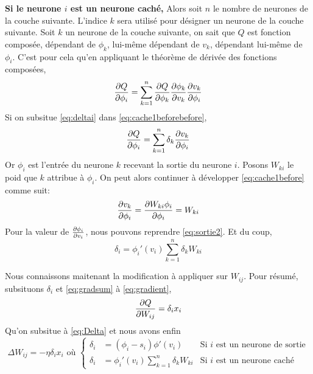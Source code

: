 \textbf{Si le neurone $i$ est un neurone caché,}
Alors soit $n$ le nombre de neurones de la couche suivante.
L'indice $k$ sera utilisé pour désigner un neurone de la couche suivante.
Soit $k$ un neurone de la couche suivante, on sait que $Q$ est fonction composée,
dépendant de $\phi_k$, lui-même dépendant de $v_k$, dépendant lui-même de $\phi_i$.
C'est pour cela qu'en appliquant le théorème de dérivée des fonctions composées,
\begin{equation}\label{eq:cache1beforebefore}
 \frac{\partial Q}{\partial \phi_i} = \sum_{k=1}^{n} \frac{\partial Q}{\partial \phi_k} \frac{\partial \phi_k}{\partial v_k} \frac{\partial v_k}{\partial \phi_i}
\end{equation}
Si on subsitue \eqref{eq:deltai} dans \eqref{eq:cache1beforebefore},
\begin{equation}\label{eq:cache1before}
 \frac{\partial Q}{\partial \phi_i} = \sum_{k=1}^{n} \delta_k \frac{\partial v_k}{\partial \phi_i}
\end{equation}
Or $\phi_i$ est l'entrée du neurone $k$ recevant la sortie du neurone $i$. Posons $W_{ki}$ le poid que $k$ attribue à $\phi_i$.
On peut alors continuer à développer \eqref{eq:cache1before} comme suit:
\begin{equation}\label{eq:cache1}
 \frac{\partial v_k}{\partial \phi_i} = \frac{\partial W_{ki}\phi_i}{\partial \phi_i} = W_{ki}
\end{equation}
Pour la valeur de $\frac{\partial \phi_i}{\partial v_i}$, nous pouvons reprendre \eqref{eq:sortie2}.
Et du coup, \[\delta_i = \phi_i'(v_i) \sum_{k=1}^{n} \delta_k W_{ki}\]

Nous connaissons maitenant la modification à appliquer sur $W_{ij}$. Pour résumé, subsituons $\delta_i$ et \eqref{eq:gradsum} à \eqref{eq:gradient},
\begin{equation}\label{eq:subgradient}
 \frac{\partial Q}{\partial W_{ij}} = \delta_i x_i
\end{equation}
Qu'on subsitue à \eqref{eq:Delta} et nous avons enfin
\begin{equation}\label{eq:mlpretro}
 \Delta W_{ij} = -\eta \delta_i x_i \text{~où~}\left\{
  \begin{array}{lll}
   \delta_i & = (\phi_i - s_i)\phi'(v_i) & \text{Si~} i \text{~est un neurone de sortie}\\
   \delta_i & = \phi_i'(v_i) \sum_{k=1}^{n} \delta_k W_{ki} & \text{Si~} i \text{~est un neurone caché}
  \end{array}
 \right.
\end{equation}
